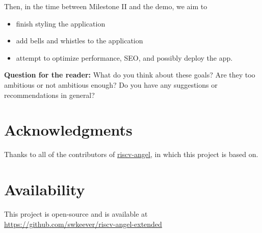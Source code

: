 Then, in the time between Milestone II and the demo, we aim to

\begin{itemize}
  \item finish styling the application
  \item add bells and whistles to the application
  \item attempt to optimize performance, SEO, and possibly deploy the app.
\end{itemize}

\textbf{Question for the reader:} What do you think about these goals?
Are they too ambitious or not ambitious enough?
Do you have any suggestions or recommendations in general?

\section*{Acknowledgments}

Thanks to all of the contributors of \href{https://github.com/riscv/riscv-angel}{riscv-angel},
in which this project is based on.

\section*{Availability}

This project is open-source and is available at
\href{https://github.com/swkeever/riscv-angel-extended}
{https://github.com/swkeever/riscv-angel-extended}





